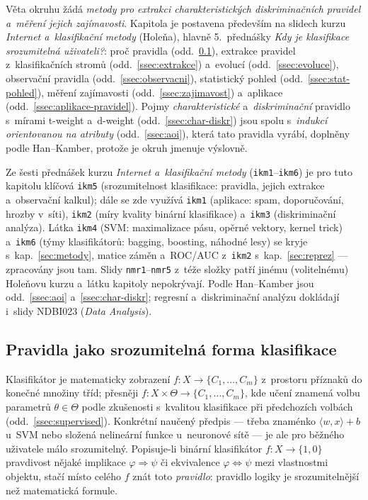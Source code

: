 \documentclass[11pt,a4paper]{article}
\theoremstyle{definition}
\begin{document}
Věta okruhu žádá \emph{metody pro extrakci charakteristických diskriminačních pravidel
a~měření jejich zajímavosti}. Kapitola je postavena především na slidech kurzu
\emph{Internet a~klasifikační metody} (Holeňa), hlavně 5.~přednášky \emph{Kdy je
klasifikace srozumitelná uživateli?}: proč pravidla (odd.~\ref{ssec:srozumitelnost}),
extrakce pravidel z~klasifikačních stromů (odd.~\ref{ssec:extrakce}) a~evolucí
(odd.~\ref{ssec:evoluce}), observační pravidla (odd.~\ref{ssec:observacni}), statistický
pohled (odd.~\ref{ssec:stat-pohled}), měření zajímavosti (odd.~\ref{ssec:zajimavost})
a~aplikace (odd.~\ref{ssec:aplikace-pravidel}). Pojmy \emph{charakteristické}
a~\emph{diskriminační} pravidlo s~mírami t-weight a~d-weight
(odd.~\ref{ssec:char-diskr}) jsou spolu s~\emph{indukcí orientovanou na atributy}
(odd.~\ref{ssec:aoi}), která tato pravidla vyrábí, doplněny podle Han--Kamber, protože je
okruh jmenuje výslovně.

\begin{poznbox}
\small
Ze šesti přednášek kurzu \emph{Internet a~klasifikační metody}
(\texttt{ikm1}--\texttt{ikm6}) je pro tuto kapitolu klíčová \texttt{ikm5}
(srozumitelnost klasifikace: pravidla, jejich extrakce a~observační kalkul); dále se zde
využívá \texttt{ikm1} (aplikace: spam, doporučování, hrozby v~síti), \texttt{ikm2} (míry
kvality binární klasifikace) a~\texttt{ikm3} (diskriminační analýza). Látka \texttt{ikm4}
(SVM: maximalizace pásu, opěrné vektory, kernel trick) a~\texttt{ikm6} (týmy
klasifikátorů: bagging, boosting, náhodné lesy) se kryje s~kap.~\ref{sec:metody}, matice
záměn a~ROC/AUC z~\texttt{ikm2} s~kap.~\ref{sec:reprez} --- zpracovány jsou tam. Slidy
\texttt{nmr1}--\texttt{nmr5} z~téže složky patří jinému (volitelnému) Holeňovu kurzu
a~látku kapitoly nepokrývají. Podle Han--Kamber jsou odd.~\ref{ssec:aoi}
a~\ref{ssec:char-diskr}; regresní a~diskriminační analýzu dokládají i~slidy NDBI023
(\emph{Data Analysis}).
\end{poznbox}

\subsection{Pravidla jako srozumitelná forma klasifikace}
\label{ssec:srozumitelnost}

Klasifikátor je matematicky zobrazení $f\colon X\to\{C_1,\dots,C_m\}$ z~prostoru příznaků
do konečné množiny tříd; přesněji $f\colon X\times\Theta\to\{C_1,\dots,C_m\}$, kde učení
znamená volbu parametrů $\theta\in\Theta$ podle zkušenosti s~kvalitou klasifikace při
předchozích volbách (odd.~\ref{ssec:supervised}). Konkrétní naučený předpis --- třeba
znaménko $\langle w,x\rangle+b$ u~SVM nebo složená nelineární funkce u~neuronové sítě ---
je ale pro běžného uživatele málo srozumitelný. Popisuje-li binární klasifikátor
$f\colon X\to\{1,0\}$ pravdivost nějaké implikace $\varphi\Rightarrow\psi$ či ekvivalence
$\varphi\Leftrightarrow\psi$ mezi vlastnostmi objektu, stačí místo celého $f$ znát toto
\emph{pravidlo}: pravidlo logiky je srozumitelnější než matematická formule.
\end{document}

